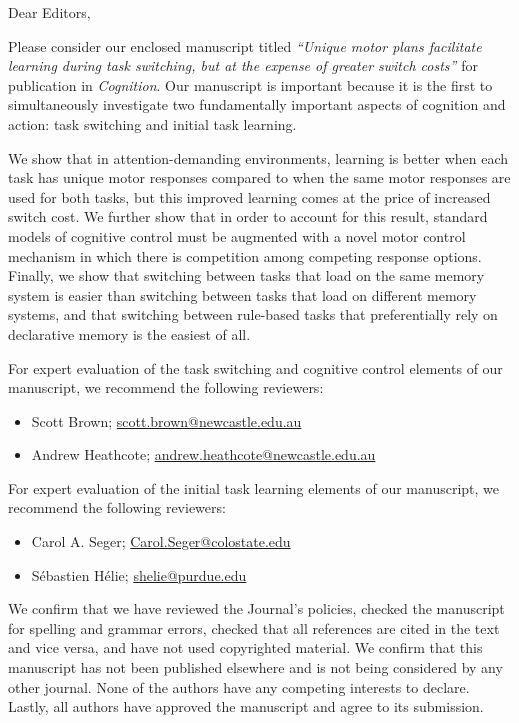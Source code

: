 \documentclass[10pt]{article}
\begin{document}
\thispagestyle{fancy}
Dear Editors,

Please consider our enclosed manuscript titled
\textit{``Unique motor plans facilitate learning during task
switching, but at the expense of greater switch costs''} for
publication in \textit{Cognition}. Our manuscript is
important because it is the first to simultaneously
investigate two fundamentally important aspects of cognition
and action: task switching and initial task learning. 

We show that in attention-demanding environments, learning
is better when each task has unique motor responses compared
to when the same motor responses are used for both tasks,
but this improved learning comes at the price of increased
switch cost. We further show that in order to account for
this result, standard models of cognitive control must be
augmented with a novel motor control mechanism in which
there is competition among competing response options.
Finally, we show that switching between tasks that load on
the same memory system is easier than switching between
tasks that load on different memory systems, and that
switching between rule-based tasks that preferentially rely
on declarative memory is the easiest of all.

For expert evaluation of the task switching and cognitive
control elements of our manuscript, we recommend the
following reviewers:

\begin{itemize}
    \item Scott Brown; \href{mailto:scott.brown@newcastle.edu.au}{scott.brown@newcastle.edu.au}
    \item Andrew Heathcote; \href{mailto:andrew.heathcote@newcastle.edu.au}{andrew.heathcote@newcastle.edu.au}
\end{itemize}

For expert evaluation of the initial task learning elements
of our manuscript, we recommend the following reviewers:

\begin{itemize}
    \item Carol A. Seger; \href{mailto:Carol.Seger@colostate.edu}{Carol.Seger@colostate.edu}
    \item S\'ebastien H\'elie; \href{mailto:shelie@purdue.edu}{shelie@purdue.edu}
\end{itemize}

We confirm that we have reviewed the Journal's policies,
checked the manuscript for spelling and grammar errors,
checked that all references are cited in the text and vice
versa, and have not used copyrighted material. We confirm
that this manuscript has not been published elsewhere and is
not being considered by any other journal. None of the
authors have any competing interests to declare. Lastly, all
authors have approved the manuscript and agree to its
submission.
\end{document}
